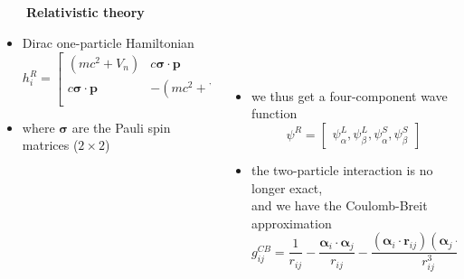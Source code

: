 \documentclass[mathserif,8pt]{beamer}
\begin{document}
\begin{frame}
\begin{columns}
    \begin{column}{.1\textwidth}
	\ \\
    \end{column}
    \end{columns}
    \ \\
    \ \\
    \ \\
    \pause
    \begin{columns}
    \begin{column}{.45\textwidth}
	\ \ \ \ \textbf{Relativistic theory}
	\begin{itemize}
	    \item Dirac one-particle Hamiltonian
		\begin{equation}
		    \nonumber
		    h_i^R = \begin{bmatrix}
			\left(mc^2 + V_n\right) & c\boldsymbol{\sigma}\cdot\boldsymbol{p}\\
			c\boldsymbol{\sigma}\cdot\boldsymbol{p}&-\left(mc^2 + V_n\right)\\
			    \end{bmatrix}
		\end{equation}
	    \item where $\boldsymbol{\sigma}$ are the Pauli spin matrices ($2\times2$)
	\end{itemize}
    \end{column}
    \begin{column}{.55\textwidth}
	\ \\
	\ \\
	\ \\
	\ \\
	\begin{itemize}
	    \item we thus get a four-component wave function
		\begin{equation}
		    \nonumber
		    \psi^{R} =	\begin{bmatrix}
				\psi_\alpha^L,\psi_\beta^L,\psi_\alpha^S,\psi_\beta^S
				\end{bmatrix}
		\end{equation}
	    \item   the two-particle interaction is no longer exact,\\
		    and we have the Coulomb-Breit approximation
		\begin{equation}
		    \nonumber
		    g_{ij}^{CB} = \frac{1}{r_{ij}} - 
		    \frac{\boldsymbol{\alpha}_i\cdot \boldsymbol{\alpha}_j}{r_{ij}} -
		    \frac{(\boldsymbol{\alpha}_i\cdot \boldsymbol{r}_{ij})
		    (\boldsymbol{\alpha}_j\cdot \boldsymbol{r}_{ij})}{r_{ij}^3} + \cdots
		\end{equation}
	\end{itemize}
    \end{column}
    \end{columns}
\end{frame}
\end{document}
